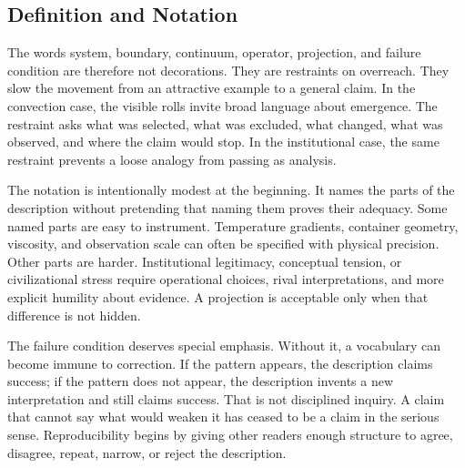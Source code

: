 \documentclass[11pt,a4paper,openany]{book}
\begin{document}
\subsection{Definition and Notation}
The words system, boundary, continuum, operator, projection, and failure condition are therefore not decorations. They are restraints on overreach. They slow the movement from an attractive example to a general claim. In the convection case, the visible rolls invite broad language about emergence. The restraint asks what was selected, what was excluded, what changed, what was observed, and where the claim would stop. In the institutional case, the same restraint prevents a loose analogy from passing as analysis. \cite{prigogine_dissipative,haken_synergetics}\par
The notation is intentionally modest at the beginning. It names the parts of the description without pretending that naming them proves their adequacy. Some named parts are easy to instrument. Temperature gradients, container geometry, viscosity, and observation scale can often be specified with physical precision. Other parts are harder. Institutional legitimacy, conceptual tension, or civilizational stress require operational choices, rival interpretations, and more explicit humility about evidence. A projection is acceptable only when that difference is not hidden.\par
The failure condition deserves special emphasis. Without it, a vocabulary can become immune to correction. If the pattern appears, the description claims success; if the pattern does not appear, the description invents a new interpretation and still claims success. That is not disciplined inquiry. A claim that cannot say what would weaken it has ceased to be a claim in the serious sense. Reproducibility begins by giving other readers enough structure to agree, disagree, repeat, narrow, or reject the description.\par
\end{document}
